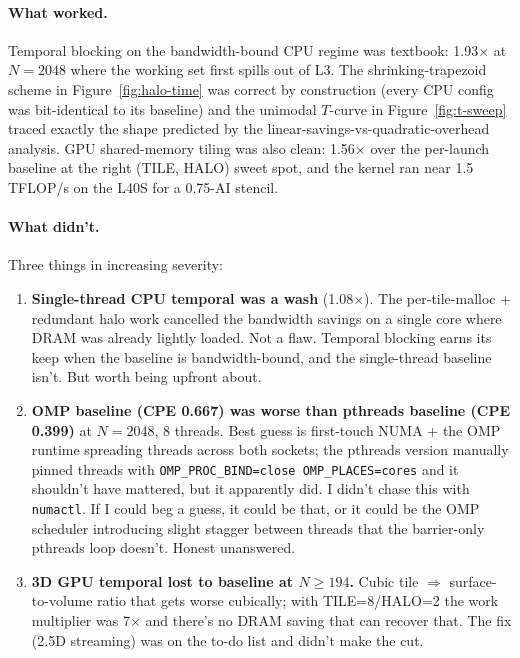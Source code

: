 \documentclass[11pt]{article}
\begin{document}
\paragraph{What worked.}  Temporal blocking on the bandwidth-bound
CPU regime was textbook: 1.93$\times$ at $N{=}2048$ where the working
set first spills out of L3.  The shrinking-trapezoid scheme in
Figure~\ref{fig:halo-time} was correct by construction (every CPU
config was bit-identical to its baseline) and the unimodal $T$-curve
in Figure~\ref{fig:t-sweep} traced exactly the shape predicted by the
linear-savings-vs-quadratic-overhead analysis.  GPU shared-memory
tiling was also clean: 1.56$\times$ over the per-launch baseline at
the right (TILE, HALO) sweet spot, and the kernel ran near 1.5\,
TFLOP/s on the L40S for a 0.75-AI stencil.

\paragraph{What didn't.}  Three things in increasing severity:

\begin{enumerate}[leftmargin=1.4em,itemsep=2pt,topsep=2pt]
  \item \textbf{Single-thread CPU temporal was a wash} (1.08$\times$).
        The per-tile-malloc + redundant halo work cancelled the
        bandwidth savings on a single core where DRAM was already
        lightly loaded.  Not a flaw. Temporal blocking earns its
        keep when the baseline is bandwidth-bound, and the
        single-thread baseline isn't.  But worth being upfront about.
  \item \textbf{OMP baseline (CPE 0.667) was worse than pthreads
        baseline (CPE 0.399)} at $N{=}2048$, 8 threads.  Best guess
        is first-touch NUMA + the OMP runtime spreading threads
        across both sockets; the pthreads version manually pinned
        threads with \texttt{OMP\_PROC\_BIND=close OMP\_PLACES=cores}
        and it shouldn't have mattered, but it apparently did.  I
        didn't chase this with \texttt{numactl}. If I could beg a
        guess, it could be that, or it could be the OMP scheduler
        introducing slight stagger between threads that the
        barrier-only pthreads loop doesn't.  Honest unanswered.
  \item \textbf{3D GPU temporal lost to baseline at $N{\geq}194$.}
        Cubic tile $\Rightarrow$ surface-to-volume ratio that gets
        worse cubically; with TILE=8/HALO=2 the work multiplier was
        7$\times$ and there's no DRAM saving that can recover that.
        The fix (2.5D streaming) was on the to-do list and didn't
        make the cut.
\end{enumerate}
\end{document}

